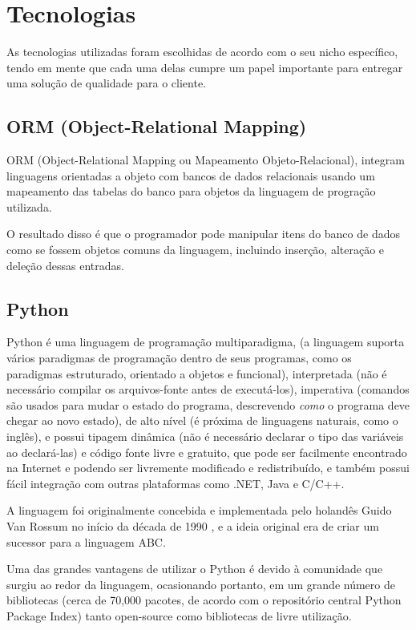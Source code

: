\documentclass[
	article,			%
	11pt,				%
	oneside,			%
	a4paper,			%
	english,			%
	brazil,				%
	sumario=tradicional
	]{abntex2}
\begin{document}
\section{Tecnologias}

As tecnologias utilizadas foram escolhidas de acordo com o seu nicho específico, tendo em mente que cada uma delas cumpre um papel importante para entregar uma solução de qualidade para o cliente.

\subsection{ORM (Object-Relational Mapping)}

ORM (Object-Relational Mapping ou Mapeamento Objeto-Relacional), integram linguagens orientadas a objeto com bancos de dados relacionais usando um mapeamento das tabelas do banco para objetos da linguagem de progração utilizada. \cite{barry}

O resultado disso é que o programador pode manipular itens do banco de dados como se fossem objetos comuns da linguagem, incluindo inserção, alteração e deleção dessas entradas.

\subsection{Python}

Python é uma linguagem de programação multiparadigma, (a linguagem suporta vários paradigmas de programação dentro de seus programas, como os paradigmas estruturado, orientado a objetos e funcional), interpretada (não é necessário compilar os arquivos-fonte antes de executá-los), imperativa (comandos são usados para mudar o estado do programa, descrevendo \textit{como} o programa deve chegar ao novo estado), de alto nível (é próxima de linguagens naturais, como o inglês), e possui tipagem dinâmica (não é necessário declarar o tipo das variáveis ao declará-las) e código fonte livre \cite{pythonlicense} e gratuito, que pode ser facilmente encontrado na Internet e podendo ser livremente modificado e redistribuído, e também possui fácil integração com outras plataformas como .NET, Java e C/C++.

A linguagem foi originalmente concebida e implementada pelo holandês Guido Van Rossum no início da década de 1990 \cite{pythonlicense}, e a ideia original era de criar um sucessor para a linguagem ABC.

Uma das grandes vantagens de utilizar o Python é devido à comunidade que surgiu ao redor da linguagem, ocasionando portanto, em um grande número de bibliotecas (cerca de 70,000 pacotes, de acordo com o repositório central Python Package Index)\cite{pypi} tanto open-source como bibliotecas de livre utilização.
\end{document}
